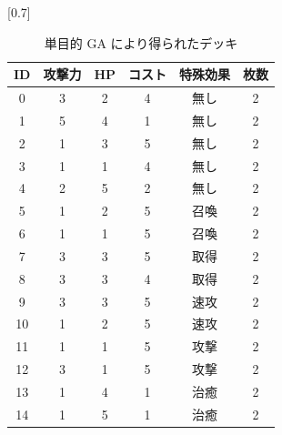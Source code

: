 \documentclass[12pt]{jarticle}
\begin{document}
\begin{table}[t]
  \centering
  \caption{単目的 GA により得られたデッキ}
  \label{table:monogadeck}
  \vspace{-0.3cm}
  \scalebox{0.7}[0.7]{
    \begin{tabular}{|c|c|c|c|c|c|}
      \hline
      ID & 攻撃力 & HP & コスト & 特殊効果 & 枚数 \\ \hline \hline
      0 & 3 & 2 & 4 & 無し & 2 \\ \hline
      1 & 5 & 4 & 1 & 無し & 2 \\ \hline
      2 & 1 & 3 & 5 & 無し & 2 \\ \hline
      3 & 1 & 1 & 4 & 無し & 2 \\ \hline
      4 & 2 & 5 & 2 & 無し & 2 \\ \hline
      5 & 1 & 2 & 5 & 召喚 & 2 \\ \hline
      6 & 1 & 1 & 5 & 召喚 & 2 \\ \hline
      7 & 3 & 3 & 5 & 取得 & 2 \\ \hline
      8 & 3 & 3 & 4 & 取得 & 2 \\ \hline
      9 & 3 & 3 & 5 & 速攻 & 2 \\ \hline
      10 & 1 & 2 & 5 & 速攻 & 2 \\ \hline
      11 & 1 & 1 & 5 & 攻撃 & 2 \\ \hline
      12 & 3 & 1 & 5 & 攻撃 & 2 \\ \hline
      13 & 1& 4 & 1 & 治癒 & 2 \\ \hline
      14 & 1 & 5 & 1 & 治癒 & 2 \\ \hline
      \end{tabular}
  }
  
  \end{table}
\end{document}
